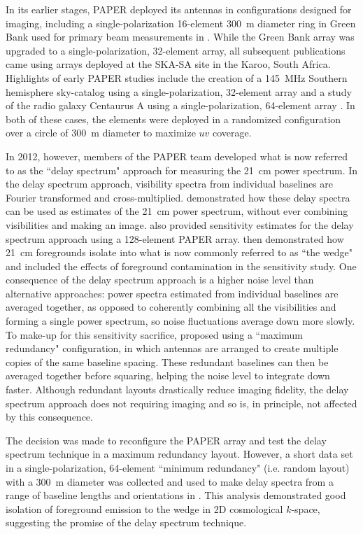In its earlier stages, PAPER deployed its antennas in configurations designed for imaging, including a single-polarization 16-element 300~m diameter ring in Green Bank used for primary beam measurements in \cite{pober12}.  While the Green Bank array was upgraded to a single-polarization, 32-element array, all subsequent publications came using arrays deployed at the SKA-SA site in the Karoo, South Africa.  Highlights of early PAPER studies include the creation of a 145\, MHz Southern hemisphere sky-catalog using a single-polarization, 32-element array \cite{jacobs10} and a study of the radio galaxy Centaurus A using a single-polarization, 64-element array \cite{stefan10}.  In both of these cases, the elements were deployed in a randomized configuration over a circle of 300~m diameter to maximize $uv$ coverage.

In 2012, however, members of the PAPER team developed what is now referred to as the ``delay spectrum" approach for measuring the 21~cm power spectrum.  In the delay spectrum approach, visibility spectra from individual baselines are Fourier transformed and cross-multiplied. \cite{parsons12a} demonstrated how these delay spectra can be used as estimates of the 21~cm power spectrum, without ever combining visibilities and making an image.  \cite{parsons12a} also provided sensitivity estimates for the delay spectrum approach using a 128-element PAPER array.  \cite{parsons12b} then demonstrated how 21~cm foregrounds isolate into what is now commonly referred to as ``the wedge" and included the effects of foreground contamination in the sensitivity study.  One consequence of the delay spectrum approach is a higher noise level than alternative approaches: power spectra estimated from individual baselines are averaged together, as opposed to coherently combining all the visibilities and forming a single power spectrum, so noise fluctuations average down more slowly.  To make-up for this sensitivity sacrifice, \cite{parsons12a} proposed using a ``maximum redundancy" configuration, in which antennas are arranged to create multiple copies of the same baseline spacing.  These redundant baselines can then be averaged together before squaring, helping the noise level to integrate down faster.  Although redundant layouts drastically reduce imaging fidelity, the delay spectrum approach does not requiring imaging and so is, in principle, not affected by this consequence.

The decision was made to reconfigure the PAPER array and test the delay spectrum technique in a maximum redundancy layout. However, a short data set in a single-polarization, 64-element ``minimum redundancy" (i.e. random layout) with a 300~m diameter was collected and used to make delay spectra from a range of baseline lengths and orientations in \cite{pober13}.  This analysis demonstrated good isolation of foreground emission to the wedge in 2D cosmological $k$-space, suggesting the promise of the delay spectrum technique.

